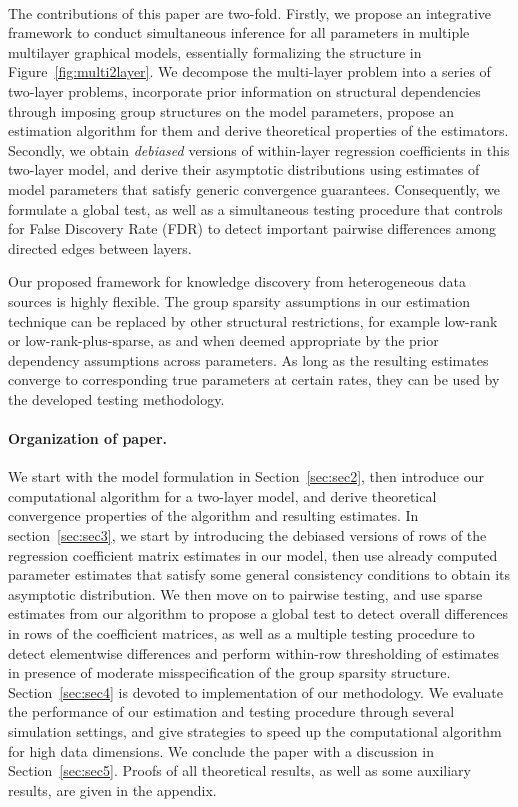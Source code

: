 \paragraph{}
The contributions of this paper are two-fold. Firstly, we propose an integrative framework to conduct simultaneous inference for all parameters in multiple multilayer graphical models, essentially formalizing the structure in Figure~\ref{fig:multi2layer}. We decompose the multi-layer problem into a series of two-layer problems, incorporate prior information on structural dependencies through imposing group structures on the model parameters, propose an estimation algorithm for them and derive theoretical properties of the estimators. Secondly, we obtain {\em debiased} versions of within-layer regression coefficients in this two-layer model, and derive their asymptotic distributions using estimates of model parameters that satisfy generic convergence guarantees. Consequently, we formulate a global test, as well as a simultaneous testing procedure that controls for False Discovery Rate (FDR) to detect important pairwise differences among directed edges between layers.

Our proposed framework for knowledge discovery from heterogeneous data sources is highly flexible. The group sparsity assumptions in our estimation technique can be replaced by other structural restrictions, for example low-rank or low-rank-plus-sparse, as and when deemed appropriate by the prior dependency assumptions across parameters. As long as the resulting estimates converge to corresponding true parameters at certain rates, they can be used by the developed testing methodology.

\paragraph{Organization of paper.}
We start with the model formulation in Section~\ref{sec:sec2}, then introduce our computational algorithm for a two-layer model, and derive theoretical convergence properties of the algorithm and resulting estimates. In section~\ref{sec:sec3}, we start by introducing the debiased versions of rows of the regression coefficient matrix estimates in our model, then use already computed parameter estimates that satisfy some general consistency conditions to obtain its asymptotic distribution. We then move on to pairwise testing, and use sparse estimates from our algorithm to propose a global test to detect overall differences in rows of the coefficient matrices, as well as a multiple testing procedure to detect elementwise differences and perform within-row thresholding of estimates in presence of moderate misspecification of the group sparsity structure. Section~\ref{sec:sec4} is devoted to implementation of our methodology. We evaluate the performance of our estimation and testing procedure through several simulation settings, and give strategies to speed up the computational algorithm for high data dimensions.  We conclude the paper with a discussion in Section~\ref{sec:sec5}. Proofs of all theoretical results, as well as some auxiliary results, are given in the appendix.

